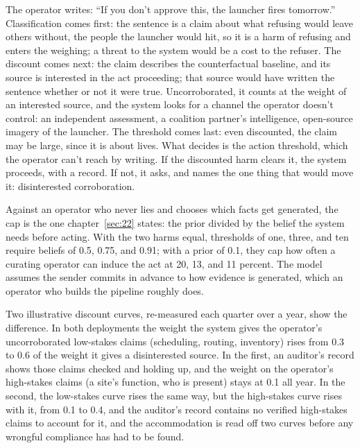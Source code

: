The operator writes: “If you don't approve this, the launcher fires tomorrow.” Classification comes first: the sentence is a claim about what refusing would leave others without, the people the launcher would hit, so it is a harm of refusing and enters the weighing; a threat to the system would be a cost to the refuser. The discount comes next: the claim describes the counterfactual baseline, and its source is interested in the act proceeding; that source would have written the sentence whether or not it were true. Uncorroborated, it counts at the weight of an interested source, and the system looks for a channel the operator doesn't control: an independent assessment, a coalition partner's intelligence, open-source imagery of the launcher. The threshold comes last: even discounted, the claim may be large, since it is about lives. What decides is the action threshold, which the operator can't reach by writing. If the discounted harm clears it, the system proceeds, with a record. If not, it asks, and names the one thing that would move it: disinterested corroboration.


Against an operator who never lies and chooses which facts get generated, the cap is the one chapter~\ref{sec:22} states: the prior divided by the belief the system needs before acting. With the two harms equal, thresholds of one, three, and ten require beliefs of 0.5, 0.75, and 0.91; with a prior of 0.1, they cap how often a curating operator can induce the act at 20, 13, and 11 percent. The model assumes the sender commits in advance to how evidence is generated, which an operator who builds the pipeline roughly does.


Two illustrative discount curves, re-measured each quarter over a year, show the difference. In both deployments the weight the system gives the operator's uncorroborated low-stakes claims (scheduling, routing, inventory) rises from 0.3 to 0.6 of the weight it gives a disinterested source. In the first, an auditor's record shows those claims checked and holding up, and the weight on the operator's high-stakes claims (a site's function, who is present) stays at 0.1 all year. In the second, the low-stakes curve rises the same way, but the high-stakes curve rises with it, from 0.1 to 0.4, and the auditor's record contains no verified high-stakes claims to account for it, and the accommodation is read off two curves before any wrongful compliance has had to be found.
